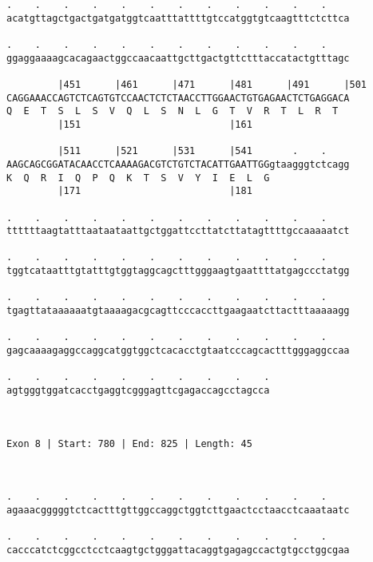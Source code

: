 \documentclass{article}
\begin{document}
\begin{Verbatim}
.    .    .    .    .    .    .    .    .    .    .    .    
acatgttagctgactgatgatggtcaatttattttgtccatggtgtcaagtttctcttca
                                                            
.    .    .    .    .    .    .    .    .    .    .    .    
ggaggaaaagcacagaactggccaacaattgcttgactgttctttaccatactgtttagc
                                                            
         |451      |461      |471      |481      |491      |501
CAGGAAACCAGTCTCAGTGTCCAACTCTCTAACCTTGGAACTGTGAGAACTCTGAGGACA
Q  E  T  S  L  S  V  Q  L  S  N  L  G  T  V  R  T  L  R  T  
         |151                          |161                 
  
         |511      |521      |531      |541       .    .    
AAGCAGCGGATACAACCTCAAAAGACGTCTGTCTACATTGAATTGGgtaagggtctcagg
K  Q  R  I  Q  P  Q  K  T  S  V  Y  I  E  L  G              
         |171                          |181                 
  
.    .    .    .    .    .    .    .    .    .    .    .    
ttttttaagtatttaataataattgctggattccttatcttatagttttgccaaaaatct
                                                            
.    .    .    .    .    .    .    .    .    .    .    .    
tggtcataatttgtatttgtggtaggcagctttgggaagtgaattttatgagccctatgg
                                                            
.    .    .    .    .    .    .    .    .    .    .    .    
tgagttataaaaaatgtaaaagacgcagttcccaccttgaagaatcttactttaaaaagg
                                                            
.    .    .    .    .    .    .    .    .    .    .    .    
gagcaaaagaggccaggcatggtggctcacacctgtaatcccagcactttgggaggccaa
                                                            
.    .    .    .    .    .    .    .    .    .
agtgggtggatcacctgaggtcgggagttcgagaccagcctagcca
                                              
                                              
 
Exon 8 | Start: 780 | End: 825 | Length: 45



.    .    .    .    .    .    .    .    .    .    .    .    
agaaacgggggtctcactttgttggccaggctggtcttgaactcctaacctcaaataatc
                                                            
.    .    .    .    .    .    .    .    .    .    .    .    
cacccatctcggcctcctcaagtgctgggattacaggtgagagccactgtgcctggcgaa
                                                            

\end{Verbatim}
\end{document}
